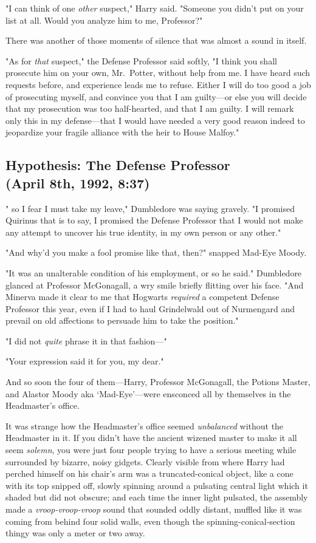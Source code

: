 "I can think of one \emph{other} suspect," Harry said. "Someone you didn't put
on your list at all. Would you analyze him to me, Professor?"

There was another of those moments of silence that was almost a sound in itself.

"As for \emph{that} suspect," the Defense Professor said softly, "I think you
shall prosecute him on your own, Mr.~Potter, without help from me. I have heard
such requests before, and experience leads me to refuse. Either I will do too
good a job of prosecuting myself, and convince you that I am guilty—or else
you will decide that my prosecution was too half-hearted, and that I am guilty.
I will remark only this in my defense—that I would have needed a very good
reason indeed to jeopardize your fragile alliance with the heir to House
Malfoy."
\sbreak
\vspace{-2\baselineskip}
\subsection{Hypothesis: The Defense Professor\\
(April 8th, 1992, 8:37\PM)}

"{\el} so I fear I must take my leave," Dumbledore was saying gravely. "I
promised Quirinus{\el} that is to say, I promised the Defense
Professor{\el} that I would not make any attempt to uncover his true
identity, in my own person or any other."

"And why'd you make a fool promise like that, then?" snapped Mad-Eye Moody.

"It was an unalterable condition of his employment, or so he said." Dumbledore
glanced at Professor McGonagall, a wry smile briefly flitting over his face.
"And Minerva made it clear to me that Hogwarts \emph{required} a competent
Defense Professor this year, even if I had to haul Grindelwald out of
Nurmengard and prevail on old affections to persuade him to take the position."

"I did not \emph{quite} phrase it in that fashion—"

"Your expression said it for you, my dear."

And so soon the four of them—Harry, Professor McGonagall, the Potions Master,
and Alastor Moody aka `Mad-Eye'—were ensconced all by themselves in the
Headmaster's office.

It was strange how the Headmaster's office seemed{\el}
\emph{unbalanced{\el}} without the Headmaster in it. If you didn't have the
ancient wizened master to make it all seem \emph{solemn}, you were just four
people trying to have a serious meeting while surrounded by bizarre, noisy
gidgets. Clearly visible from where Harry had perched himself on his chair's
arm was a truncated-conical object, like a cone with its top snipped off,
slowly spinning around a pulsating central light which it shaded but did not
obscure; and each time the inner light pulsated, the assembly made a
\emph{vroop-vroop-vroop} sound that sounded oddly distant, muffled like it was
coming from behind four solid walls, even though the spinning-conical-section
thingy was only a meter or two away.

